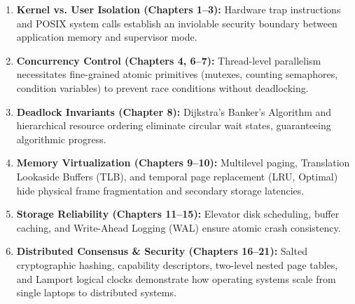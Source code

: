 \documentclass[11pt,a4paper]{report}
\begin{document}
\begin{enumerate}
    \item \textbf{Kernel vs. User Isolation (Chapters 1--3):} Hardware trap instructions and POSIX system calls establish an inviolable security boundary between application memory and supervisor mode.
    \item \textbf{Concurrency Control (Chapters 4, 6--7):} Thread-level parallelism necessitates fine-grained atomic primitives (mutexes, counting semaphores, condition variables) to prevent race conditions without deadlocking.
    \item \textbf{Deadlock Invariants (Chapter 8):} Dijkstra's Banker's Algorithm and hierarchical resource ordering eliminate circular wait states, guaranteeing algorithmic progress.
    \item \textbf{Memory Virtualization (Chapters 9--10):} Multilevel paging, Translation Lookaside Buffers (TLB), and temporal page replacement (LRU, Optimal) hide physical frame fragmentation and secondary storage latencies.
    \item \textbf{Storage Reliability (Chapters 11--15):} Elevator disk scheduling, buffer caching, and Write-Ahead Logging (WAL) ensure atomic crash consistency.
    \item \textbf{Distributed Consensus \& Security (Chapters 16--21):} Salted cryptographic hashing, capability descriptors, two-level nested page tables, and Lamport logical clocks demonstrate how operating systems scale from single laptops to distributed systems.
\end{enumerate}
\end{document}
